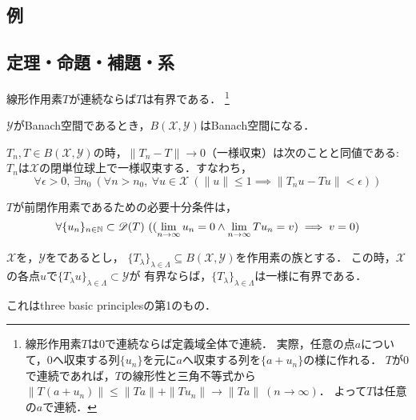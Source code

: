 \documentclass[a4j]{jarticle}
\newcommand{\dom}{\mathscr{D}}
\newcommand{\spB}[2]{B(\mathscr{#1}, \mathscr{#2})}
\newcommand{\spX}{\mathscr{X}}
\newcommand{\spY}{\mathscr{Y}}
\begin{document}
    \subsection{例}

    \subsection{定理・命題・補題・系}
    \begin{Them}[定理7.1, p.148] \label{them7:1}
        線形作用素$T$が連続ならば$T$は有界である．
        \footnote{線形作用素$T$は0で連続ならば定義域全体で連続．
        実際，任意の点$a$について，0へ収束する列$\{u_n\}$を元に$a$へ収束する列を$\{a+u_n\}$の様に作れる．
        $T$が0で連続であれば，$T$の線形性と三角不等式から$\|T(a+u_n)\| \leq \|Ta\|+\|Tu_n\| \to \|Ta\|~(n \to \infty)$．
        よって$T$は任意の$a$で連続．}
    \end{Them}

    \begin{Them}[定理7.6, p.150] \label{them7:6}
        $\spY$がBanach空間であるとき，$\spB{X}{Y}$はBanach空間になる．
    \end{Them}

    \begin{Them}[定理7.8, p.153] \label{them7:8}
        $T_n, T \in \spB{X}{Y}$の時，$\|T_n - T\| \to 0$（一様収束）は次のことと同値である:
        $T_n$は$\spX$の閉単位球上で一様収束する．すなわち，
        \[ \forall \epsilon>0,~ \exists n_0~ ( \forall n>n_0,~ \forall u \in \spX~ (\|u\| \leq 1 \implies \|T_n u - T u\|<\epsilon)) \]
    \end{Them}
    \begin{Them}[定理7.20 (i), p.166] \label{them7:20}
        $T$が前閉作用素であるための必要十分条件は，
        \[ \forall \{ u_n \}_{n \in \N} \subset \dom(T)~ ((\lim_{n \to \infty}u_n=0  \wedge \lim_{n \to \infty}Tu_n=v) \implies v=0) \]
    \end{Them}

    \begin{Them}[定理7.21, p.166, 一様有界性の原理] \label{them7:21}
        $\spX$を，$\spY$をであるとし，
        $\{ T_{\lambda} \}_{\lambda \in \Lambda} \subseteq \spB{X}{Y}$を作用素の族とする．
        この時，$\spX$の各点$u$で$\{ T_{\lambda}u \}_{\lambda \in \Lambda} \subset \spY$が
        有界ならば，$\{ T_{\lambda} \}_{\lambda \in \Lambda}$は一様に有界である．
    \end{Them}
    これはthree basic principlesの第1のもの．
\end{document}
